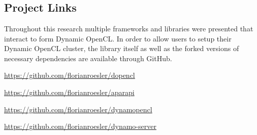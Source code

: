 \chapter{\appendixname}

\section{Project Links}
\label{appendix:links}
Throughout this research multiple frameworks and libraries were presented that interact to form Dynamic OpenCL. In order to allow users to setup their Dynamic OpenCL cluster, the library itself as well as the forked versions of necessary dependencies are available through GitHub.

\begin{description}[align=left]
	\item [dOpenCL] \url{https://github.com/florianroesler/dopencl}
	\item [Aparapi] \url{https://github.com/florianroesler/aparapi}
	\item [Dynamic OpenCL] \url{https://github.com/florianroesler/dynamopencl}
	\item [Dynamic OpenCL Server] \url{https://github.com/florianroesler/dynamo-server}
\end{description}

